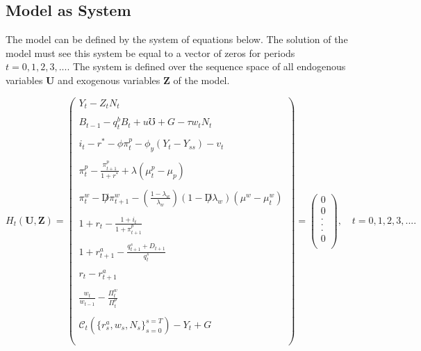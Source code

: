\documentclass[titlepage]{\econtex}\providecommand{\texname}{BufferStockTheory}
\begin{document}
\hypertarget{Model as System}{}
\subsection{Model as System}

The model can be defined by the system of equations below. The solution of the model must see this system be equal to a vector of zeros for periods $t =0, 1, 2, 3, ...$. The system is defined over the sequence space of all endogenous variables $\mathbf{U}$  and exogenous variables $\mathbf{Z}$ of the model.

$$
H_{t}(\mathbf{U},\mathbf{Z})= \begin{pmatrix} 
 Y_{t} - Z_{t}N_{t} \\ \\ 
B_{t-1} - q^{b}_{t}B_{t} + u\mho + G - \tau w_{t} N_{t} \\ \\  
i_{t} - r^{*} - \phi \pi^{p}_{t} -\phi_{y}(Y_{t}-Y_{ss}) - v_{t} \\ \\
\pi_{t}^{p} -\frac{\pi^{p}_{t+1}}{1+r^{*}} + \lambda(\mu_{t}^{p} -\mu_{p})  \\ \\
 \pi_{t}^{w} -\not D \pi_{t+1}^{w} -(\frac{1-\lambda_{w}}{\lambda_{w}}) (1- \not D \lambda_{w}) (\mu^{w} -\mu_{t}^{w}) \\ \\
    1+r_{t} - \frac{1 + i_{t}}{1+ \pi^{p}_{t+1}}\\ \\
 1+r_{t+1}^{a} - \frac{q_{t+1}^{s} +D_{t+1}}{q_{t}^{s}} \\ \\
 r_{t} - r_{t+1}^{a} \\ \\
 \frac{w_{t}}{w_{t-1}} - \frac{\Pi_{t}^{w}}{\Pi_{t}^{p}} \\ \\
 \mathcal{C}_{t}(\{r_{s}^{a} ,w_{s}, N_{s}\}_{s=0}^{s=T}) - Y_{t} + G \\ \\
 \end{pmatrix} = \begin{pmatrix} 0 \\ 0 \\. \\. \\. \\ 0\\ \end{pmatrix} , \quad t=0,1 ,2,3,....
$$ \\ \\
 
\end{document}
